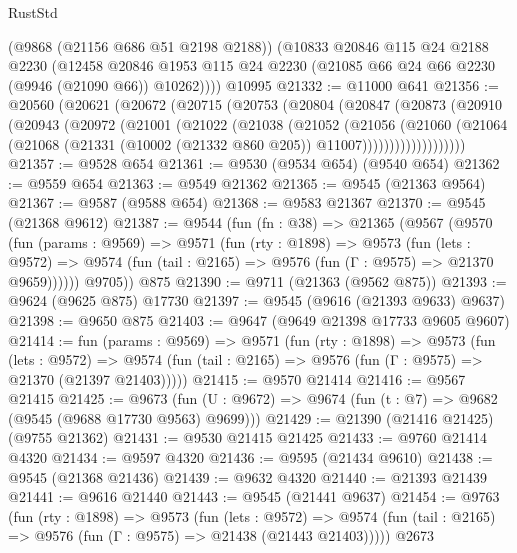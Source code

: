 \begin{lexlean}{RustStd}
\begin{coremodule}
      (@9868 (@21156 @686 @51 @2198 @2188))
      (@10833
        @20846
        @115
        @24
        @2188
        @2230
        (@12458
          @20846
          @1953
          @115
          @24
          @2230
          (@21085 @66 @24 @66 @2230 (@9946 (@21090 @66)) @10262))))
    @10995
@21332 := @11000 @641
@21356 := @20560
    (@20621
      (@20672
        (@20715
          (@20753
            (@20804
              (@20847
                (@20873
                  (@20910
                    (@20943
                      (@20972
                        (@21001
                          (@21022
                            (@21038
                              (@21052
                                (@21056
                                  (@21060
                                    (@21064
                                      (@21068
                                        (@21331
                                          (@10002 (@21332 @860 @205))
                                          @11007)))))))))))))))))))
@21357 := @9528 @654
@21361 := @9530 (@9534 @654) (@9540 @654)
@21362 := @9559 @654
@21363 := @9549 @21362
@21365 := @9545 (@21363 @9564)
@21367 := @9587 (@9588 @654)
@21368 := @9583 @21367
@21370 := @9545 (@21368 @9612)
@21387 := @9544
    (fun (fn : @38) =>
    @21365
      (@9567
        (@9570
          (fun (params : @9569) =>
          @9571
            (fun (rty : @1898) =>
            @9573
              (fun (lets : @9572) =>
              @9574 (fun (tail : @2165) => @9576 (fun (Γ : @9575) => @21370 @9659))))))
        @9705))
    @875
@21390 := @9711 (@21363 (@9562 @875))
@21393 := @9624 (@9625 @875) @17730
@21397 := @9545 (@9616 (@21393 @9633) @9637)
@21398 := @9650 @875
@21403 := @9647 (@9649 @21398 @17733 @9605 @9607)
@21414 := fun (params : @9569) =>
  @9571
    (fun (rty : @1898) =>
    @9573
      (fun (lets : @9572) =>
      @9574 (fun (tail : @2165) => @9576 (fun (Γ : @9575) => @21370 (@21397 @21403)))))
@21415 := @9570 @21414
@21416 := @9567 @21415
@21425 := @9673
    (fun (U : @9672) => @9674 (fun (t : @7) => @9682 (@9545 (@9688 @17730 @9563) @9699)))
@21429 := @21390 (@21416 @21425) (@9755 @21362)
@21431 := @9530 @21415 @21425
@21433 := @9760 @21414 @4320
@21434 := @9597 @4320
@21436 := @9595 (@21434 @9610)
@21438 := @9545 (@21368 @21436)
@21439 := @9632 @4320
@21440 := @21393 @21439
@21441 := @9616 @21440
@21443 := @9545 (@21441 @9637)
@21454 := @9763
    (fun (rty : @1898) =>
    @9573
      (fun (lets : @9572) =>
      @9574 (fun (tail : @2165) => @9576 (fun (Γ : @9575) => @21438 (@21443 @21403)))))
    @2673

\end{coremodule}
\end{lexlean}
